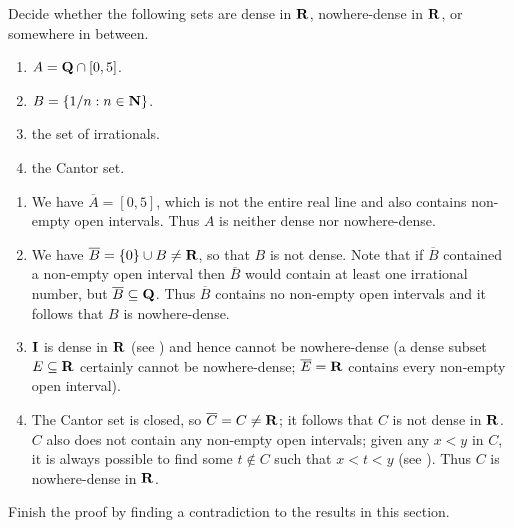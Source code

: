 \documentclass{lew98_solutions}
\begin{document}
\begin{exercise}
\label{ex:3.5.9}
    Decide whether the following sets are dense in \( \mathbf{R} \), nowhere-dense in \( \mathbf{R} \), or somewhere in between.
    \begin{enumerate}
        \item \( A = \mathbf{Q} \cap [0, 5] \).

        \item \( B = \{ 1/n : n \in \mathbf{N} \} \).

        \item the set of irrationals.

        \item the Cantor set.
    \end{enumerate}
\end{exercise}

\begin{solution}
    \begin{enumerate}
        \item We have \( \overline{A} = [0, 5] \), which is not the entire real line and also contains non-empty open intervals. Thus \( A \) is neither dense nor nowhere-dense.

        \item We have \( \overline{B} = \{ 0 \} \cup B \neq \mathbf{R} \), so that \( B \) is not dense. Note that if \( \overline{B} \) contained a non-empty open interval then \( \overline{B} \) would contain at least one irrational number, but \( \overline{B} \subseteq \mathbf{Q} \). Thus \( \overline{B} \) contains no non-empty open intervals and it follows that \( B \) is nowhere-dense.

        \item \( \mathbf{I} \) is dense in \( \mathbf{R} \) (see ) and hence cannot be nowhere-dense (a dense subset \( E \subseteq \mathbf{R} \) certainly cannot be nowhere-dense; \( \overline{E} = \mathbf{R} \) contains every non-empty open interval).

        \item The Cantor set is closed, so \( \overline{C} = C \neq \mathbf{R} \); it follows that \( C \) is not dense in \( \mathbf{R} \). \( C \) also does not contain any non-empty open intervals; given any \( x < y \) in \( C \), it is always possible to find some \( t \not\in C \) such that \( x < t < y \) (see ). Thus \( C \) is nowhere-dense in \( \mathbf{R} \).
    \end{enumerate}
\end{solution}

\begin{exercise}
\label{ex:3.5.10}
    Finish the proof by finding a contradiction to the results in this section.
\end{exercise}
\end{document}
